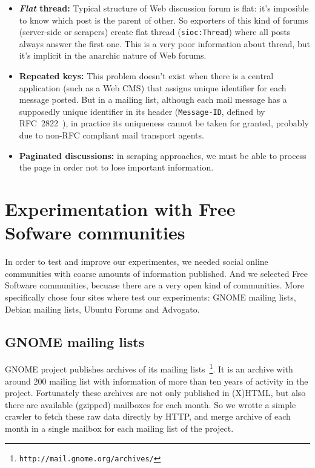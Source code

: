 \documentclass{../templates/www2008-submission}
\begin{document}
\begin{itemize}
  \item \textbf{\textit{Flat} thread:} Typical structure of Web discussion
	forum is flat: it's imposible to know which post is the parent of
	other. So exporters of this kind of forums (server-side or scrapers)
	create flat thread (\texttt{sioc:Thread}) where all posts always answer
	the first one. This is a very poor information about thread, but it's
	implicit in the anarchic nature of Web forums.

  \item \textbf{Repeated keys:} This problem doesn't exist when there is a 
	central application (such as a Web CMS) that assigns unique identifier 
	for each message posted. But in a mailing list, although each mail 
	message has a supposedly unique identifier in its header 
	(\texttt{Message-ID}, defined by RFC~2822~\cite{RFC2822}), 
	in practice its uniqueness cannot be taken for granted,
	probably due to non-RFC compliant mail transport agents.

  \item \textbf{Paginated discussions:} in scraping approaches, we must be able 
	to process the page in order not to lose important information.

\end{itemize}


\section{Experimentation with Free\\ Sofware communities}

In order to test and improve our experimentes, we needed social
online communities with coarse amounts of information published.
And we selected Free Software communities, becuase there are a very
open kind of communities. More specifically chose four sites where
test our experiments: GNOME mailing lists, Debian mailing lists,
Ubuntu Forums and Advogato.

\subsection{\label{sec:gnome}GNOME mailing lists}

GNOME project publishes archives of its mailing lists~\footnote{\texttt{http://mail.gnome.org/archives/}}.
It is an archive with around 200 mailing list with information of 
more than ten years of activity in the project. Fortunately these
archives are not only published in (X)HTML, but also there are 
available (gzipped) mailboxes for each month. So we wrotte a simple
crawler to fetch these raw data directly by HTTP, and merge archive
of each month in a single mailbox for each mailing list of the project.
\end{document}
